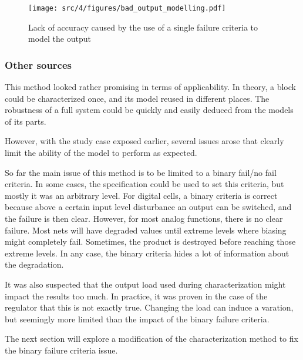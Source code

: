 \begin{figure}[!h]
  \centering
  \texttt{[image: src/4/figures/bad\_output\_modelling.pdf]}
  \caption{Lack of accuracy caused by the use of a single failure criteria to model the output}
  \label{fig:impact-single-failure-criteria}
\end{figure}


\subsubsection{Other sources}


This method looked rather promising in terms of applicability.
In theory, a block could be characterized once, and its model reused in different places.
The robustness of a full system could be quickly and easily deduced from the models of its parts.

However, with the study case exposed earlier, several issues arose that clearly limit the ability of the model to perform as expected.

So far the main issue of this method is to be limited to a binary fail/no fail criteria.
In some cases, the specification could be used to set this criteria, but mostly it was an arbitrary level.
For digital cells, a binary criteria is correct because above a certain input level disturbance an output can be switched, and the failure is then clear.
However, for most analog functions, there is no clear failure.
Most nets will have degraded values until extreme levels where biasing might completely fail.
Sometimes, the product is destroyed before reaching those extreme levels.
In any case, the binary criteria hides a lot of information about the degradation.

It was also suspected that the output load used during characterization might impact the results too much.
In practice, it was proven in the case of the regulator that this is not exactly true.
Changing the load can induce a varation, but seemingly more limited than the impact of the binary failure criteria.


The next section will explore a modification of the characterization method to fix the binary failure criteria issue.
